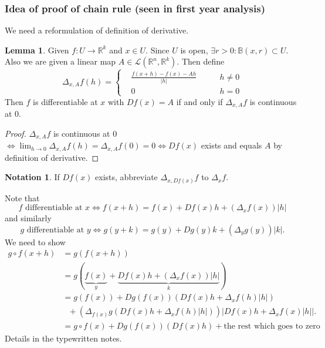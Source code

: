 \documentclass[a4paper]{article}
\theoremstyle{definition}
\newtheorem{lemma}[defn]{Lemma}
\newtheorem*{notation}{Notation}
\begin{document}
\subsubsection{Idea of proof of chain rule (seen in first year analysis)}
We need a reformulation of definition of derivative.
\begin{lemma}
Given $f:U\rightarrow \mathbb R^k$ and $x\in U$. Since $U$ is open, $\exists r>0 : \mathbb B(x,r) \subset U.$ Also we are given a linear map $A \in \mathcal L(\mathbb R^n,\mathbb R^k)$. Then define
\[
\Delta_{x,A}f(h) = \left\{\begin{aligned}
&\frac{f(x+h)-f(x)-Ah}{|h|} \qquad &h\neq 0 \\
&0 \qquad &h=0
\end{aligned} \right.
\]
Then $f$ is differentiable at $x$ with $Df(x)=A$ if and only if $\Delta_{x,A}f$ is continuous at 0.
\end{lemma}
\begin{proof}
$\Delta_{x,A}f$ is continuous at 0 $\Leftrightarrow \lim_{h\rightarrow 0} \Delta_{x,A}f(h)=\Delta_{x,A}f(0)=0 \Leftrightarrow Df(x)$ exists and equals $A$ by definition of derivative. 
\end{proof}
\begin{notation}
If $Df(x)$ exists, abbreviate $\Delta_{x,Df(x)}f$ to $\Delta_x f$.
\end{notation}
Note that
\[
f\text{ differentiable at }x \Leftrightarrow f(x+h)=f(x)+Df(x)h+\left(\Delta_x f(x)\right)|h|
\]
and similarly
\[
g\text{ differentiable at }y \Leftrightarrow g(y+k)=g(y)+Dg(y)k+\left(\Delta_y g(y)\right)|k| .
\]
We need to show
\[
\begin{aligned}
g\circ f (x+h) &= g(f(x+h)) \\&= g(\underbrace{f(x)}_{y}+\underbrace{Df(x)h+\left(\Delta_x f(x)\right)|h|}_{k}) \\&= g(f(x))+Dg(f(x)) (Df(x)h+\Delta_x f(h) |h|) \\&\ \ \ + \left(\Delta_{f(x)}g(Df(x)h+\Delta_x f(h)|h|) \right) |Df(x)h+\Delta_x f(x)|h| |. \\&= g\circ f(x) + Dg(f(x))(Df(x)h)+\text{the rest which goes to zero}
\end{aligned}
\]
Details in the typewritten notes.
\end{document}
